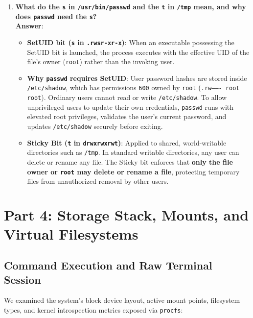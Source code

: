 \documentclass[12pt,a4paper]{article}
\begin{document}
\begin{enumerate}
    \item \textbf{What do the \texttt{s} in \texttt{/usr/bin/passwd} and the \texttt{t} in \texttt{/tmp} mean, and why does \texttt{passwd} need the \texttt{s}?} \\
    \textbf{Answer}:
    \begin{itemize}
        \item \textbf{SetUID bit (\texttt{s} in \texttt{.rwsr-xr-x})}: When an executable possessing the SetUID bit is launched, the process executes with the effective UID of the file's owner (\texttt{root}) rather than the invoking user.
        \item \textbf{Why \texttt{passwd} requires SetUID}: User password hashes are stored inside \texttt{/etc/shadow}, which has permissions \texttt{600} owned by \texttt{root} (\texttt{.rw------- root root}). Ordinary users cannot read or write \texttt{/etc/shadow}. To allow unprivileged users to update their own credentials, \texttt{passwd} runs with elevated root privileges, validates the user's current password, and updates \texttt{/etc/shadow} securely before exiting.
        \item \textbf{Sticky Bit (\texttt{t} in \texttt{drwxrwxrwt})}: Applied to shared, world-writable directories such as \texttt{/tmp}. In standard writable directories, any user can delete or rename any file. The Sticky bit enforces that \textbf{only the file owner or \texttt{root} may delete or rename a file}, protecting temporary files from unauthorized removal by other users.
    \end{itemize}
\end{enumerate}

\newpage

\section{Part 4: Storage Stack, Mounts, and Virtual Filesystems}

\subsection{Command Execution and Raw Terminal Session}
We examined the system's block device layout, active mount points, filesystem types, and kernel introspection metrics exposed via \texttt{procfs}:
\end{document}
